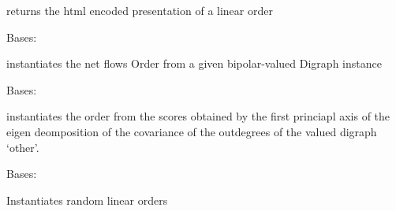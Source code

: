 \documentclass[letterpaper,10pt,english]{sphinxmanual}
\begin{document}
\begin{fulllineitems}
\begin{fulllineitems}
\end{fulllineitems}


\begin{fulllineitems}
\label{techDoc:linearOrders.LinearOrder.htmlOrder}
returns the html encoded presentation of a linear order

\end{fulllineitems}


\end{fulllineitems}


\begin{fulllineitems}
\label{techDoc:linearOrders.NetFlowsOrder}
Bases: {\hyperref[techDoc:linearOrders.LinearOrder]{}}

instantiates the net flows Order from
a given bipolar-valued Digraph instance

\end{fulllineitems}


\begin{fulllineitems}
\label{techDoc:linearOrders.PrincipalOrder}
Bases: {\hyperref[techDoc:linearOrders.LinearOrder]{}}

instantiates the order from the scores obtained by the first
princiapl axis of the eigen deomposition of the covariance of the
outdegrees of the valued digraph `other'.

\end{fulllineitems}


\begin{fulllineitems}
\label{techDoc:linearOrders.RandomLinearOrder}
Bases: {\hyperref[techDoc:linearOrders.LinearOrder]{}}

Instantiates random linear orders

\end{fulllineitems}
\end{document}
